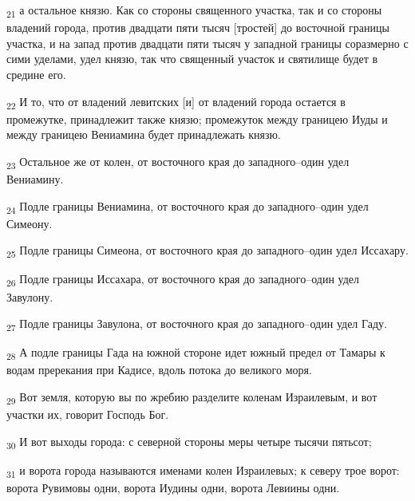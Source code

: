 \begin{tcolorbox}
\textsubscript{21} а остальное князю. Как со стороны священного участка, так и со стороны владений города, против двадцати пяти тысяч [тростей] до восточной границы участка, и на запад против двадцати пяти тысяч у западной границы соразмерно с сими уделами, удел князю, так что священный участок и святилище будет в средине его.
\end{tcolorbox}
\begin{tcolorbox}
\textsubscript{22} И то, что от владений левитских [и] от владений города остается в промежутке, принадлежит также князю; промежуток между границею Иуды и между границею Вениамина будет принадлежать князю.
\end{tcolorbox}
\begin{tcolorbox}
\textsubscript{23} Остальное же от колен, от восточного края до западного--один удел Вениамину.
\end{tcolorbox}
\begin{tcolorbox}
\textsubscript{24} Подле границы Вениамина, от восточного края до западного--один удел Симеону.
\end{tcolorbox}
\begin{tcolorbox}
\textsubscript{25} Подле границы Симеона, от восточного края до западного--один удел Иссахару.
\end{tcolorbox}
\begin{tcolorbox}
\textsubscript{26} Подле границы Иссахара, от восточного края до западного--один удел Завулону.
\end{tcolorbox}
\begin{tcolorbox}
\textsubscript{27} Подле границы Завулона, от восточного края до западного--один удел Гаду.
\end{tcolorbox}
\begin{tcolorbox}
\textsubscript{28} А подле границы Гада на южной стороне идет южный предел от Тамары к водам пререкания при Кадисе, вдоль потока до великого моря.
\end{tcolorbox}
\begin{tcolorbox}
\textsubscript{29} Вот земля, которую вы по жребию разделите коленам Израилевым, и вот участки их, говорит Господь Бог.
\end{tcolorbox}
\begin{tcolorbox}
\textsubscript{30} И вот выходы города: с северной стороны меры четыре тысячи пятьсот;
\end{tcolorbox}
\begin{tcolorbox}
\textsubscript{31} и ворота города называются именами колен Израилевых; к северу трое ворот: ворота Рувимовы одни, ворота Иудины одни, ворота Левиины одни.
\end{tcolorbox}

